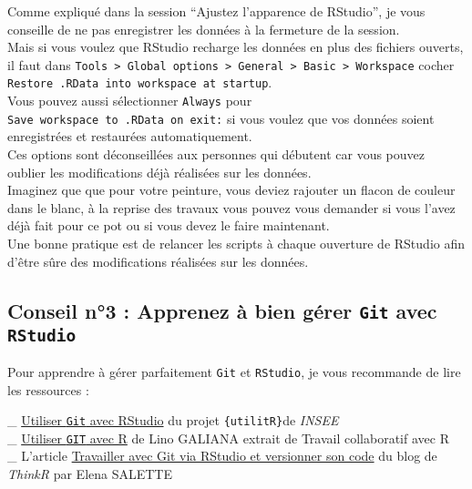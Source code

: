 \documentclass[
  letterpaper,
  DIV=11,
  numbers=noendperiod]{scrartcl}
\begin{document}
Comme expliqué dans la session ``Ajustez l'apparence de RStudio'', je
vous conseille de ne pas enregistrer les données à la fermeture de la
session.\\
Mais si vous voulez que RStudio recharge les données en plus des
fichiers ouverts, il faut dans
\texttt{Tools\ \textgreater{}\ Global\ options\ \textgreater{}\ General\ \textgreater{}\ Basic\ \textgreater{}\ Workspace}
cocher \texttt{Restore\ .RData\ into\ workspace\ at\ startup}.\\
Vous pouvez aussi sélectionner \texttt{Always} pour
\texttt{Save\ workspace\ to\ .RData\ on\ exit:} si vous voulez que vos
données soient enregistrées et restaurées automatiquement.\\
Ces options sont déconseillées aux personnes qui débutent car vous
pouvez oublier les modifications déjà réalisées sur les données.\\
Imaginez que que pour votre peinture, vous deviez rajouter un flacon de
couleur dans le blanc, à la reprise des travaux vous pouvez vous
demander si vous l'avez déjà fait pour ce pot ou si vous devez le faire
maintenant.\\
Une bonne pratique est de relancer les scripts à chaque ouverture de
RStudio afin d'être sûre des modifications réalisées sur les données.

\hypertarget{conseil-n3-apprenez-uxe0-bien-guxe9rer-git-avec-rstudio}{%
\subsection{\texorpdfstring{\textbf{Conseil n°3} : Apprenez à bien gérer
\texttt{Git} avec
\texttt{RStudio}}{Conseil n°3 : Apprenez à bien gérer Git avec RStudio}}\label{conseil-n3-apprenez-uxe0-bien-guxe9rer-git-avec-rstudio}}

Pour apprendre à gérer parfaitement \texttt{Git} et \texttt{RStudio}, je
vous recommande de lire les ressources :

\_
\href{https://www.book.utilitr.org/03_fiches_thematiques/fiche_git_utilisation}{Utiliser
\texttt{Git} avec RStudio} du projet \texttt{\{utilitR\}}de
\emph{INSEE}\\
\_
\href{https://linogaliana.gitlab.io/collaboratif/git.html\#des-bases-de-git}{Utiliser
\texttt{GIT} avec R} de Lino GALIANA extrait de Travail collaboratif
avec R\\
\_ L'article
\href{https://thinkr.fr/travailler-avec-git-via-rstudio-et-versionner-son-code/}{Travailler
avec Git via RStudio et versionner son code} du blog de \emph{ThinkR}
par Elena SALETTE
\end{document}
